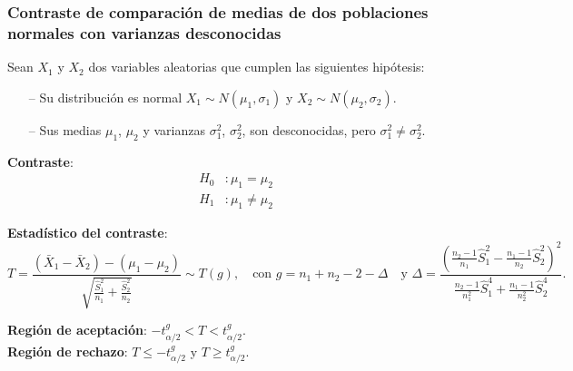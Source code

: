 \begin{frame}
\frametitle{Contraste de comparación de medias de dos poblaciones normales con varianzas desconocidas}
Sean $X_1$ y $X_2$ dos variables aleatorias que cumplen las siguientes hipótesis:
\begin{itemize}
\item[--] Su distribución es normal $X_1\sim N(\mu_1,\sigma_1)$ y $X_2\sim N(\mu_2,\sigma_2)$.
\item[--] Sus medias $\mu_1$, $\mu_2$ y varianzas $\sigma_1^2$, $\sigma_2^2$, son desconocidas, pero $\sigma^2_1\not = \sigma^2_2$.
\end{itemize}
\textbf{Contraste}:
\begin{align*}
H_0 &: \mu_1=\mu_2\\
H_1 &: \mu_1\neq \mu_2
\end{align*}

\textbf{Estadístico del contraste}:
{%
\[
T=\frac{(\bar{X}_1-\bar{X}_2)-(\mu_1-\mu_2)}{\sqrt{\frac{\hat{S}^2_1}{n_1}+\frac{\hat{S}^2_2}{n_2}}} \sim T(g),\quad \text {con } g=n_1+n_2-2-\Delta\quad \text{y } \Delta = \frac{(\frac{n_2-1}{n_1}\hat{S}_1^2-\frac{n_1-1}{n_2}\hat{S}_2^2)^2}{\frac{n_2-1}{n_1^2}\hat{S}_1^4+\frac{n_1-1}{n_2^2}\hat{S}_2^4}.
\]
}

\textbf{Región de aceptación}: $-t^{g}_{\alpha/2}< T < t^{g}_{\alpha/2}$.\\
\textbf{Región de rechazo}: $T\leq -t^{g}_{\alpha/2}$ y $T\geq t^{g}_{\alpha/2}$.
\end{frame}


